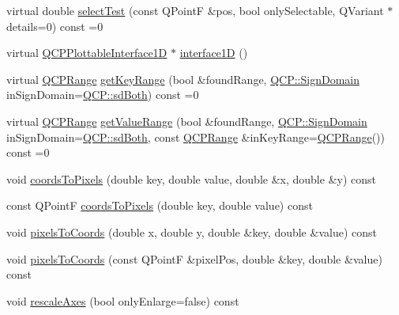 \begin{DoxyCompactItemize}
\item 
virtual double \mbox{\hyperlink{class_q_c_p_abstract_plottable_a38efe9641d972992a3d44204bc80ec1d}{select\+Test}} (const Q\+PointF \&pos, bool only\+Selectable, Q\+Variant $\ast$details=0) const =0
\item 
virtual \mbox{\hyperlink{class_q_c_p_plottable_interface1_d}{Q\+C\+P\+Plottable\+Interface1D}} $\ast$ \mbox{\hyperlink{class_q_c_p_abstract_plottable_a81fd9fd5c4f429c074785e2eb238a8e7}{interface1D}} ()
\item 
virtual \mbox{\hyperlink{class_q_c_p_range}{Q\+C\+P\+Range}} \mbox{\hyperlink{class_q_c_p_abstract_plottable_a4da16d3cd4b509e1104a9b0275623c96}{get\+Key\+Range}} (bool \&found\+Range, \mbox{\hyperlink{namespace_q_c_p_afd50e7cf431af385614987d8553ff8a9}{Q\+C\+P\+::\+Sign\+Domain}} in\+Sign\+Domain=\mbox{\hyperlink{namespace_q_c_p_afd50e7cf431af385614987d8553ff8a9aa38352ef02d51ddfa4399d9551566e24}{Q\+C\+P\+::sd\+Both}}) const =0
\item 
virtual \mbox{\hyperlink{class_q_c_p_range}{Q\+C\+P\+Range}} \mbox{\hyperlink{class_q_c_p_abstract_plottable_a4de773988b21ed090fddd27c6a3a3dcb}{get\+Value\+Range}} (bool \&found\+Range, \mbox{\hyperlink{namespace_q_c_p_afd50e7cf431af385614987d8553ff8a9}{Q\+C\+P\+::\+Sign\+Domain}} in\+Sign\+Domain=\mbox{\hyperlink{namespace_q_c_p_afd50e7cf431af385614987d8553ff8a9aa38352ef02d51ddfa4399d9551566e24}{Q\+C\+P\+::sd\+Both}}, const \mbox{\hyperlink{class_q_c_p_range}{Q\+C\+P\+Range}} \&in\+Key\+Range=\mbox{\hyperlink{class_q_c_p_range}{Q\+C\+P\+Range}}()) const =0
\item 
void \mbox{\hyperlink{class_q_c_p_abstract_plottable_a7ad84a36472441cf1f555c5683d0da93}{coords\+To\+Pixels}} (double key, double value, double \&x, double \&y) const
\item 
const Q\+PointF \mbox{\hyperlink{class_q_c_p_abstract_plottable_a5acb50ae984eef09a7ab92315d2ad708}{coords\+To\+Pixels}} (double key, double value) const
\item 
void \mbox{\hyperlink{class_q_c_p_abstract_plottable_a3903c1120ab5c27e7fa46b597ef267bd}{pixels\+To\+Coords}} (double x, double y, double \&key, double \&value) const
\item 
void \mbox{\hyperlink{class_q_c_p_abstract_plottable_a28d32c0062b9450847851ffdee1c5f69}{pixels\+To\+Coords}} (const Q\+PointF \&pixel\+Pos, double \&key, double \&value) const
\item 
void \mbox{\hyperlink{class_q_c_p_abstract_plottable_a1491c4a606bccd2d09e65e11b79eb882}{rescale\+Axes}} (bool only\+Enlarge=false) const

\end{DoxyCompactItemize}
